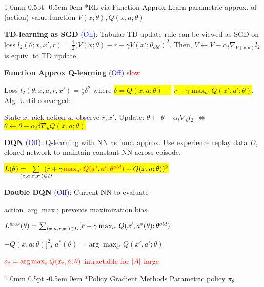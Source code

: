 \documentclass[11pt,landscape,a4paper,fleqn]{article}
\makeatletter
\newcommand*{\rsection}{%
	\@startsection{section}%
	{1}%
	{0mm}%
	{0.5pt}%
	{-0.5em \@plus 0em}
	{\color{myorange}\sffamily\small\bfseries}}
\newcommand{\mhl}[1]{\setlength{\fboxsep}{0pt}\colorbox{yellow}{#1}}
\makeatother
\begin{document}
\begin{multicols*}{4}

\rsection*{RL via Function Approx} {\fontsize{9.5}{6}\selectfont Learn parametric approx. of (action) value function $V(x; \theta), Q(x,a;\theta)$}

\vspace*{1mm}
\textbf{TD-learning as SGD} {\fontsize{9}{6}\selectfont \textcolor{blue}{(On)}}: Tabular TD update rule can be viewed as SGD on loss $l_2(\theta; x, x', r) = \frac{1}{2}(V(x;\theta) - r - \gamma V(x'; \theta_{old})^2$. Then, $V \leftarrow V - \alpha_t \nabla_{V(x;\theta)} l_2$ is equiv. to TD update.

\textbf{Function Approx Q-learning} {\fontsize{9}{6}\selectfont \textcolor{blue}{(Off)}} \textcolor{red}{slow}

Loss $l_2(\theta;x,a,r,x') = \frac{1}{2}\delta^2$ where
\mhl{$\delta = Q(x,a;\theta) -$} \mhl{$r - \gamma \max_{a'}Q(x',a';\theta)$}. Alg: Until converged:

State $x$, pick action $a$, observe $r,x'$. Update: $\theta \leftarrow \theta - \alpha_t \nabla_\theta l_2$
$\Leftrightarrow$ \mhl{$\theta \leftarrow \theta - \alpha_t \delta \nabla_\theta Q(x,a;\theta)$}

\textbf{DQN} {\fontsize{9}{6}\selectfont \textcolor{blue}{(Off)}}: Q-learning with NN as func. approx. Use experience replay data $D$, cloned network to maintain constant NN across episode.

\mhl{$L(\theta) = \hspace*{-4mm} \sum\limits_{(x,a,r,x') \in D} \hspace*{-4mm} (r + \gamma \textcolor{red}{\max_{a'} Q(x', a'; \theta^{old})} - Q(x,a;\theta))^2$}

\textbf{Double DQN} {\fontsize{9}{6}\selectfont \textcolor{blue}{(Off)}}: Current NN to evaluate

action $\arg\max$; prevents maximization bias.

$L^{{\scaleobj{.55}{ DDQN}}} (\theta) = \hspace*{0mm} \sum_{(x,a,r,x') \in D} \hspace*{0mm} [r + \gamma \max_{a'} Q(x', a^*(\theta); \theta^{old})$

$ - Q(x,a;\theta) ]^2$,
$a^*(\theta) = \arg\max_{a'} Q(x', a'; \theta)$

\textcolor{red}{$\textcolor{red}{a_t = \arg\max_a Q(x_t,a;\theta)}$ intractable for $\textcolor{red}{|A|}$ large}


\rsection*{Policy Gradient Methods} Parametric policy $\pi_\theta$


\end{multicols*}
\end{document}
